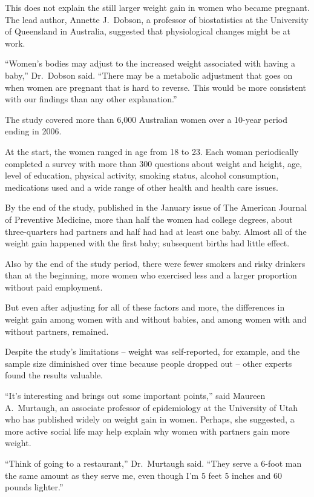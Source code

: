 ﻿\documentclass[12pt]{article}
\begin{document}
This does not explain the still larger weight gain in women who became pregnant. The lead author,
Annette J.~Dobson, a professor of biostatistics at the University of Queensland in Australia,
suggested that physiological changes might be at work.

``Women's bodies may adjust to the increased weight associated with having a baby,'' Dr.~Dobson
said. ``There may be a metabolic adjustment that goes on when women are pregnant that is hard to
reverse. This would be more consistent with our findings than any other explanation.''

The study covered more than 6,000 Australian women over a 10-year period ending in 2006.

At the start, the women ranged in age from 18 to 23. Each woman periodically completed a survey with
more than 300 questions about weight and height, age, level of education, physical activity, smoking
status, alcohol consumption, medications used and a wide range of other health and health care
issues.

By the end of the study, published in the January issue of The American Journal of Preventive
Medicine, more than half the women had college degrees, about three-quarters had partners and half
had had at least one baby. Almost all of the weight gain happened with the first baby; subsequent
births had little effect.

Also by the end of the study period, there were fewer smokers and risky drinkers than at the
beginning, more women who exercised less and a larger proportion without paid employment.

But even after adjusting for all of these factors and more, the differences in weight gain among
women with and without babies, and among women with and without partners, remained.

Despite the study's limitations -- weight was self-reported, for example, and the sample size
diminished over time because people dropped out -- other experts found the results valuable.

``It's interesting and brings out some important points,'' said Maureen A.~Murtaugh, an associate
professor of epidemiology at the University of Utah who has published widely on weight gain in
women. Perhaps, she suggested, a more active social life may help explain why women with partners
gain more weight.

``Think of going to a restaurant,'' Dr.~Murtaugh said. ``They serve a 6-foot man the same amount as
they serve me, even though I'm 5 feet 5 inches and 60 pounds lighter.''
\end{document}
